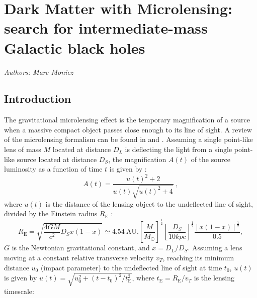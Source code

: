 \section{Dark Matter with Microlensing: search for intermediate-mass Galactic black holes}
\emph{Authors: Marc Moniez}
\subsection{Introduction}
    
    The gravitational microlensing effect is the temporary magnification of a source
when a massive compact object passes close enough to its line of sight.
A review of the microlensing formalism can be found in \cite{j2006} and \cite{Rahvar_2015}.
Assuming a single point-like lens of mass $M$ located at distance $D_L$ is deflecting the
light from a single point-like source located at distance $D_S$, the magnification $A(t)$
of the source luminosity as a function of time $t$ is given by \cite{Paczynski_1986} :
\begin{equation}
\label{magnification}
A(t)=\frac{u(t)^2+2}{u(t)\sqrt{u(t)^2+4}}\ ,
\end{equation}
where $u(t)$ is the distance of the lensing object to the undeflected line of sight, divided by
the Einstein radius $R_{\mathrm{E}}$ :
\begin{equation}
R_{\mathrm{E}}\!\! =\!\! \sqrt{\frac{4GM}{c^2}D_S x(1-x)}
\simeq\! 4.54\ \mathrm{AU}.\left[\frac{M}{M_\odot}\right]^{\frac{1}{2}}\!
\left[\frac{D_S}{10 kpc}\right]^{\frac{1}{2}}\!\!
\frac{\left[x(1-x)\right]^{\frac{1}{2}}}{0.5}, \nonumber
\end{equation}
$G$ is the Newtonian gravitational constant, and $x = D_L/D_S$.
Assuming a lens moving at a constant relative transverse
velocity $v_T$, reaching its minimum
distance $u_0$ (impact parameter) to the undeflected line of sight
at time $t_0$, $u(t)$ is given by $u(t)=\sqrt{u_0^2+(t-t_0)^2/t_{\mathrm{E}}^2}$,
where $t_{\mathrm{E}}=R_{\mathrm{E}} /v_T$ is the lensing timescale:
